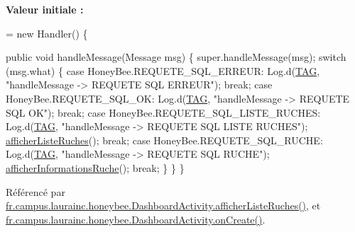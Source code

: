 {\bfseries Valeur initiale \+:}
\begin{DoxyCode}
= \textcolor{keyword}{new} Handler()
    \{
        
        \textcolor{keyword}{public} \textcolor{keywordtype}{void} handleMessage(Message msg)
        \{
        super.handleMessage(msg);
        \textcolor{keywordflow}{switch} (msg.what)
        \{
            \textcolor{keywordflow}{case} HoneyBee.REQUETE\_SQL\_ERREUR:
                Log.d(\hyperlink{classfr_1_1campus_1_1laurainc_1_1honeybee_1_1_dashboard_activity_a716b8b0ff7279634ec5d3079ddf5d840}{TAG}, \textcolor{stringliteral}{"handleMessage -> REQUETE SQL ERREUR"});
                \textcolor{keywordflow}{break};
            \textcolor{keywordflow}{case} HoneyBee.REQUETE\_SQL\_OK:
                Log.d(\hyperlink{classfr_1_1campus_1_1laurainc_1_1honeybee_1_1_dashboard_activity_a716b8b0ff7279634ec5d3079ddf5d840}{TAG}, \textcolor{stringliteral}{"handleMessage -> REQUETE SQL OK"});
                \textcolor{keywordflow}{break};
            \textcolor{keywordflow}{case} HoneyBee.REQUETE\_SQL\_LISTE\_RUCHES:
                Log.d(\hyperlink{classfr_1_1campus_1_1laurainc_1_1honeybee_1_1_dashboard_activity_a716b8b0ff7279634ec5d3079ddf5d840}{TAG}, \textcolor{stringliteral}{"handleMessage -> REQUETE SQL LISTE RUCHES"});
                \hyperlink{classfr_1_1campus_1_1laurainc_1_1honeybee_1_1_dashboard_activity_aeb7cdaf69c379e2b070e290130199543}{afficherListeRuches}();
                \textcolor{keywordflow}{break};
            \textcolor{keywordflow}{case} HoneyBee.REQUETE\_SQL\_RUCHE:
                Log.d(\hyperlink{classfr_1_1campus_1_1laurainc_1_1honeybee_1_1_dashboard_activity_a716b8b0ff7279634ec5d3079ddf5d840}{TAG}, \textcolor{stringliteral}{"handleMessage -> REQUETE SQL RUCHE"});
                \hyperlink{classfr_1_1campus_1_1laurainc_1_1honeybee_1_1_dashboard_activity_a88f00531bee33bd6c47b33f5ac4df9ed}{afficherInformationsRuche}();
                \textcolor{keywordflow}{break};
        \}
        \}
    \}
\end{DoxyCode}


Référencé par \hyperlink{classfr_1_1campus_1_1laurainc_1_1honeybee_1_1_dashboard_activity_aeb7cdaf69c379e2b070e290130199543}{fr.\+campus.\+laurainc.\+honeybee.\+Dashboard\+Activity.\+afficher\+Liste\+Ruches()}, et \hyperlink{classfr_1_1campus_1_1laurainc_1_1honeybee_1_1_dashboard_activity_a8a6794a48e1b328dfc58d9d1c9237d79}{fr.\+campus.\+laurainc.\+honeybee.\+Dashboard\+Activity.\+on\+Create()}.

\mbox{\label{classfr_1_1campus_1_1laurainc_1_1honeybee_1_1_dashboard_activity_a2f9d67ea169a7cd9969d0fbe30e77fbc}} 
